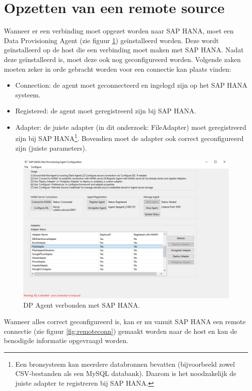 \section{Opzetten van een remote source}
Wanneer er een verbinding moet opgezet worden naar SAP HANA, moet een Data Provisioning Agent (zie figuur \ref{fig:dpa}) geïnstalleerd worden. Deze wordt geïnstalleerd op de host die een verbinding moet maken met SAP HANA. Nadat deze geïnstalleerd is, moet deze ook nog geconfigureerd worden. Volgende zaken moeten zeker in orde gebracht worden voor een connectie kan plaats vinden: 
\begin{itemize}
	\item Connection: de agent moet geconnecteerd en ingelogd zijn op het SAP HANA systeem.
	\item Registered: de agent moet geregistreerd zijn bij SAP HANA.
	\item Adapter: de juiste adapter (in dit onderzoek: FileAdapter) moet geregistreerd zijn bij SAP HANA\footnote[1]{Een bronsysteem kan meerdere databronnen bevatten (bijvoorbeeld zowel CSV-bestanden als een MySQL databank). Daarom is het noodzakelijk de juiste adapter te registreren bij SAP HANA.}. Bovendien moet de adapter ook correct geconfigureerd zijn (juiste parameters).
\end{itemize} 

\begin{figure}[h]
	\centering
	\includegraphics[scale=0.5]{../images/DPAgent.png}
	\caption{DP Agent verbonden met SAP HANA.}
	\label{fig:dpa}
\end{figure}

Wanneer alles correct geconfigureerd is, kan er nu vanuit SAP HANA een remote connectie (zie figuur \ref{fig:remoteconn}) gemaakt worden naar de host en kan de benodigde informatie opgevraagd worden.

